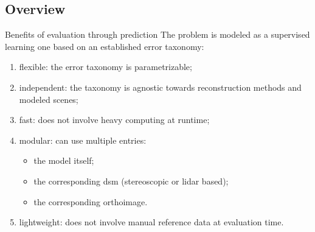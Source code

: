 \documentclass{beamer}
\begin{document}
        \subsection{Overview}
            \begin{frame}{Benefits of evaluation through prediction}
                The problem is modeled as a supervised learning one based on an established error taxonomy:
                \begin{enumerate}[label = (\roman*)., font=\color{IGNGreen}]
                    \item<2-> flexible: the error taxonomy is parametrizable;
                    \item<3-> independent: the taxonomy is agnostic towards reconstruction methods and modeled scenes;
                    \item<4-> fast: does not involve heavy computing at runtime;
                    \item<5-> modular: can use multiple entries:
                    \begin{itemize}[label=--]
                        \item<6-> the model itself;
                        \item<7-> the corresponding \gls{dsm} (stereoscopic or \gls{lidar} based);
                        \item<8-> the corresponding orthoimage.
                    \end{itemize}
                    \item<9-> lightweight: does not involve manual reference data at evaluation time.
                \end{enumerate}
            \end{frame}
\end{document}
